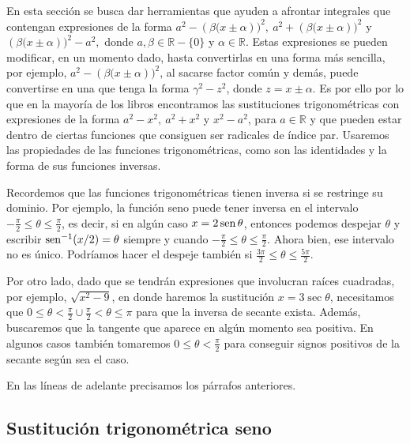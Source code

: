 En esta sección se busca dar herramientas que ayuden a afrontar integrales que contengan expresiones de la forma $a^{2}-\left( \beta(x\pm \alpha\right))^{2},\ a^{2}+\left( \beta(x\pm \alpha\right) )^{2}$ y $\left( \beta(x\pm \alpha\right))^{2}-a^{2},$ donde $a, \beta\in\mathbb{R}-\{0\}$ y $\alpha\in \mathbb{R}.$ Estas expresiones se pueden modificar, en un momento dado, hasta convertirlas en una forma más sencilla, por ejemplo, $a^{2}-\left( \beta(x\pm \alpha\right))^{2}$, al sacarse factor común y demás, puede convertirse en una que tenga la forma $\gamma^2-z^2$, donde $z=x\pm \alpha$. Es por ello por lo que en la mayoría de los libros encontramos las sustituciones trigonométricas con expresiones de la forma $a^2-x^2,\ a^2+x^2$ y $x^2-a^2$, para $a\in\mathbb{R}$ y que pueden estar dentro de ciertas funciones que consiguen ser radicales de índice par. Usaremos las propiedades de las funciones trigonométricas, como son las identidades y la forma de sus funciones inversas.

Recordemos que las funciones trigonométricas tienen inversa si se restringe su dominio. Por ejemplo, la función seno puede tener inversa en el intervalo $-\frac{\pi}{2}\leq\theta\leq\frac{\pi}{2}$, es decir, si en algún caso $x=2\operatorname{sen} \theta$, entonces podemos despejar $\theta$ y escribir $\operatorname{sen}^{-1}(x/2)=\theta$ siempre y cuando $-\frac{\pi}{2}\leq\theta\leq\frac{\pi}{2}$. Ahora bien, ese intervalo no es único. Podríamos hacer el despeje también si $\frac{3\pi}{2}\leq\theta\leq\frac{5\pi}{2}$.

Por otro lado, dado que se tendrán expresiones que involucran raíces cuadradas, por ejemplo, $\sqrt{x^2-9}$, en donde haremos la sustitución $x=3\sec\theta$, necesitamos que $0\leq\theta<\frac{\pi}{2}\cup \frac{\pi}{2}<\theta\leq\pi$ para que la inversa de secante exista. Además, buscaremos que la tangente que aparece en algún momento sea positiva. En algunos casos también tomaremos $0\leq\theta<\frac{\pi}{2}$ para conseguir signos positivos de la secante según sea el caso.

En las líneas de adelante precisamos los párrafos anteriores.

\subsection{Sustitución trigonométrica seno}

\enlargethispage{-\baselineskip}


